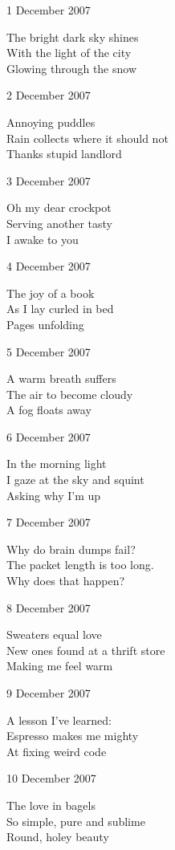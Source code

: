 \documentclass[12pt]{article}
\begin{document}
1 December 2007

The bright dark sky shines \\
With the light of the city \\
Glowing through the snow

2 December 2007

Annoying puddles \\
Rain collects where it should not \\
Thanks stupid landlord

3 December 2007

Oh my dear crockpot \\
Serving another tasty \\
I awake to you



\newpage

4 December 2007

The joy of a book \\
As I lay curled in bed \\
Pages unfolding

5 December 2007

A warm breath suffers \\
The air to become cloudy \\
A fog floats away

6 December 2007

In the morning light \\
I gaze at the sky and squint \\
Asking why I'm up

7 December 2007

Why do brain dumps fail? \\
The packet length is too long. \\
Why does that happen?

8 December 2007

Sweaters equal love \\
New ones found at a thrift store \\
Making me feel warm

9 December 2007

A lesson I've learned: \\
Espresso makes me mighty \\
At fixing weird code

10 December 2007

The love in bagels \\
So simple, pure and sublime \\
Round, holey beauty
\end{document}
